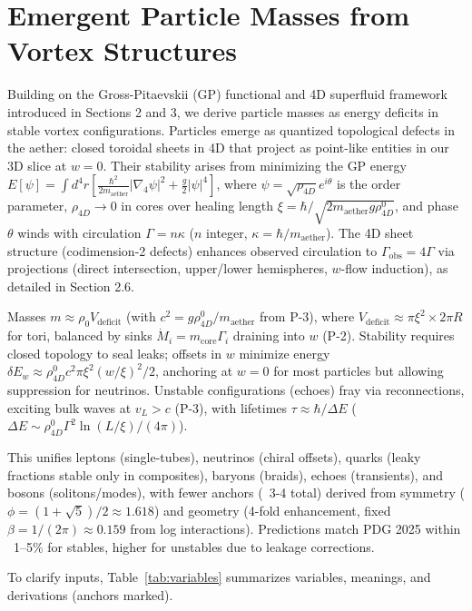 \section{Emergent Particle Masses from Vortex Structures}

Building on the Gross-Pitaevskii (GP) functional and 4D superfluid framework introduced in Sections 2 and 3, we derive particle masses as energy deficits in stable vortex configurations. Particles emerge as quantized topological defects in the aether: closed toroidal sheets in 4D that project as point-like entities in our 3D slice at $w=0$. Their stability arises from minimizing the GP energy $E[\psi] = \int d^4 r \left[ \frac{\hbar^2}{2 m_{\text{aether}}} |\nabla_4 \psi|^2 + \frac{g}{2} |\psi|^4 \right]$, where $\psi = \sqrt{\rho_{4D}} e^{i \theta}$ is the order parameter, $\rho_{4D} \to 0$ in cores over healing length $\xi = \hbar / \sqrt{2 m_{\text{aether}} g \rho_{4D}^0}$, and phase $\theta$ winds with circulation $\Gamma = n \kappa$ ($n$ integer, $\kappa = \hbar / m_{\text{aether}}$). The 4D sheet structure (codimension-2 defects) enhances observed circulation to $\Gamma_{\text{obs}} = 4\Gamma$ via projections (direct intersection, upper/lower hemispheres, $w$-flow induction), as detailed in Section 2.6.

Masses $m \approx \rho_0 V_{\text{deficit}}$ (with $c^2 = g \rho_{4D}^0 / m_{\text{aether}}$ from P-3), where $V_{\text{deficit}} \approx \pi \xi^2 \times 2\pi R$ for tori, balanced by sinks $\dot{M}_i = m_{\text{core}} \Gamma_i$ draining into $w$ (P-2). Stability requires closed topology to seal leaks; offsets in $w$ minimize energy $\delta E_w \approx \rho_{4D}^0 c^2 \pi \xi^2 (w / \xi)^2 / 2$, anchoring at $w=0$ for most particles but allowing suppression for neutrinos. Unstable configurations (echoes) fray via reconnections, exciting bulk waves at $v_L > c$ (P-3), with lifetimes $\tau \approx \hbar / \Delta E$ ($\Delta E \sim \rho_{4D}^0 \Gamma^2 \ln(L / \xi) / (4\pi)$).

This unifies leptons (single-tubes), neutrinos (chiral offsets), quarks (leaky fractions stable only in composites), baryons (braids), echoes (transients), and bosons (solitons/modes), with fewer anchors (~3-4 total) derived from symmetry ($\phi = (1 + \sqrt{5})/2 \approx 1.618$) and geometry (4-fold enhancement, fixed $\beta = 1/(2\pi) \approx 0.159$ from log interactions). Predictions match PDG 2025 within ~1--5\% for stables, higher for unstables due to leakage corrections.

To clarify inputs, Table~\ref{tab:variables} summarizes variables, meanings, and derivations (anchors marked).

